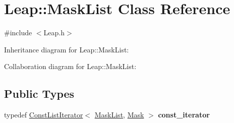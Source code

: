 \hypertarget{class_leap_1_1_mask_list}{}\section{Leap\+:\+:Mask\+List Class Reference}
\label{class_leap_1_1_mask_list}


{\ttfamily \#include $<$Leap.\+h$>$}



Inheritance diagram for Leap\+:\+:Mask\+List\+:


Collaboration diagram for Leap\+:\+:Mask\+List\+:
\subsection*{Public Types}
\begin{DoxyCompactItemize}
\item 
\mbox{\label{class_leap_1_1_mask_list_a78efb66c6393e9f3864695d709646f36}} 
typedef \hyperlink{class_leap_1_1_const_list_iterator}{Const\+List\+Iterator}$<$ \hyperlink{class_leap_1_1_mask_list}{Mask\+List}, \hyperlink{class_leap_1_1_mask}{Mask} $>$ {\bfseries const\+\_\+iterator}
\end{DoxyCompactItemize}
